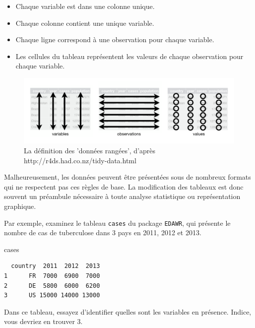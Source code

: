 \documentclass[a4paperpaper,]{article}
\newenvironment{Shaded}{\begin{snugshade}}{\end{snugshade}}
\newcommand{\NormalTok}[1]{\textcolor[rgb]{0.12,0.11,0.11}{#1}}
\providecommand{\tightlist}{%
  \setlength{\itemsep}{0pt}\setlength{\parskip}{0pt}}
\begin{document}
\begin{itemize}
\tightlist
\item
  Chaque variable est dans une colonne unique.
\item
  Chaque colonne contient une unique variable.
\item
  Chaque ligne correspond à une observation pour chaque variable.
\item
  Les cellules du tableau représentent les valeurs de chaque observation pour chaque variable.
\end{itemize}

\begin{figure}[htpb]

{\centering \includegraphics[width=0.9\linewidth]{images/tidy} 

}

\caption{La définition des 'données rangées', d'après http://r4ds.had.co.nz/tidy-data.html}\label{fig:tidyschema}
\end{figure}

Malheureusement, les données peuvent être présentées sous de nombreux formats qui ne respectent pas ces règles de base. La modification des tableaux est donc souvent un préambule nécessaire à toute analyse statistique ou représentation graphique.

Par exemple, examinez le tableau \texttt{cases} du package \texttt{EDAWR}, qui présente le nombre de cas de tuberculose dans 3 pays en 2011, 2012 et 2013.

\begin{Shaded}
\begin{Highlighting}[]
\NormalTok{cases}
\end{Highlighting}
\end{Shaded}

\begin{verbatim}
  country  2011  2012  2013
1      FR  7000  6900  7000
2      DE  5800  6000  6200
3      US 15000 14000 13000
\end{verbatim}

Dans ce tableau, essayez d'identifier quelles sont les variables en présence. Indice, vous devriez en trouver 3.
\end{document}
